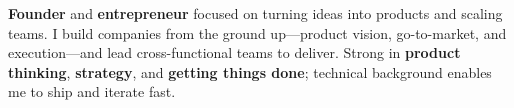 \documentclass[10pt,a4paper]{altacv}
\begin{document}

\begin{fullwidth}
\makecvheader
\vspace{-2mm}
\textbf{Founder} and \textbf{entrepreneur} focused on turning ideas into products and scaling teams. I build companies from the ground up—product vision, go-to-market, and execution—and lead cross-functional teams to deliver. Strong in \textbf{product thinking}, \textbf{strategy}, and \textbf{getting things done}; technical background enables me to ship and iterate fast.
\end{fullwidth}
\end{document}
